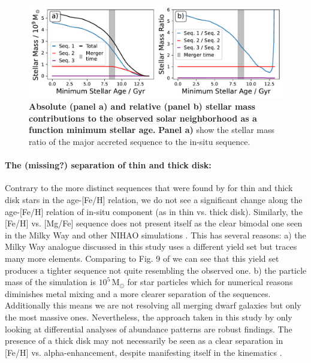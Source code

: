 \documentclass[fleqn,usenatbib]{mnras}
\begin{document}
\begin{figure}
	\includegraphics[width=\columnwidth]{figures/sequence_mass_ratios.pdf}
    \caption{
    \textbf{Absolute (panel a) and relative (panel b) stellar mass contributions to the observed solar neighborhood as a function minimum stellar age.}
    \textbf{Panel a)} show the stellar mass ratio of the major accreted sequence to the in-situ sequence.
    }
    \label{fig:sequence_mass_ratios}
\end{figure}

\paragraph*{The (missing?) separation of thin and thick disk:}
Contrary to the more distinct sequences that were found by \cite{Nissen2020, Sahlholdt2022, Xiang2022} for thin and thick disk stars in the age-[Fe/H] relation, we do not see a significant change along the age-[Fe/H] relation of in-situ component (as in thin vs. thick disk). Similarly, the [Fe/H] vs. [Mg/Fe] sequence does not present itself as the clear bimodal one seen in the Milky Way \citep{Hayden2015} and other NIHAO simulations \citep{Buck2020, Buck2023}. This has several reasons: a) the Milky Way analogue discussed in this study uses a different yield set \citep[\textsc{alt} as shown in][]{Buck2021} but traces many more elements. Comparing to Fig. 9 of \citet{Buck2021} we can see that this yield set produces a tighter sequence not quite resembling the observed one. b) the particle mass of the simulation is $10^5\,\mathrm{M_\odot}$ for star particles which for numerical reasons diminishes metal mixing and a more clearer separation of the sequences. Additionally this means we are not resolving all merging dwarf galaxies but only the most massive ones. Nevertheless, the approach taken in this study by only looking at differential analyses of abundance patterns are robust findings. The presence of a thick disk may not necessarily be seen as a clear separation in [Fe/H] vs. alpha-enhancement, despite manifesting itself in the kinematics \citep[see e.g.][their Fig.~12]{MCM2013}.
\end{document}
